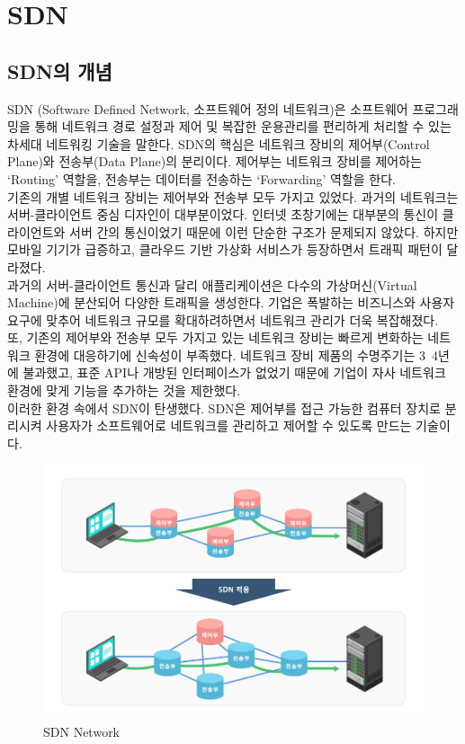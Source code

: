 \section{SDN}
\subsection{SDN의 개념}
    SDN (Software Defined Network, 소프트웨어 정의 네트워크)은 소프트웨어 프로그래밍을 통해 네트워크 경로 설정과 제어 및 복잡한 운용관리를 편리하게 처리할 수 있는 차세대 네트워킹 기술을 말한다. SDN의 핵심은 네트워크 장비의 제어부(Control Plane)와 전송부(Data Plane)의 분리이다. 제어부는 네트워크 장비를 제어하는 ‘Routing’ 역할을, 전송부는 데이터를 전송하는 ‘Forwarding’ 역할을 한다. \\
    기존의 개별 네트워크 장비는 제어부와 전송부 모두 가지고 있었다. 과거의 네트워크는 서버-클라이언트 중심 디자인이 대부분이었다. 인터넷 초창기에는 대부분의 통신이 클라이언트와 서버 간의 통신이었기 때문에 이런 단순한 구조가 문제되지 않았다. 하지만 모바일 기기가 급증하고, 클라우드 기반 가상화 서비스가 등장하면서 트래픽 패턴이 달라졌다. \\
    과거의 서버-클라이언트 통신과 달리 애플리케이션은 다수의 가상머신(Virtual Machine)에 분산되어 다양한 트래픽을 생성한다. 기업은 폭발하는 비즈니스와 사용자 요구에 맞추어 네트워크 규모를 확대하려하면서 네트워크 관리가 더욱 복잡해졌다. \\
    또, 기존의 제어부와 전송부 모두 가지고 있는 네트워크 장비는 빠르게 변화하는 네트워크 환경에 대응하기에 신속성이 부족했다. 네트워크 장비 제품의 수명주기는 3~4년에 불과했고, 표준 API나 개방된 인터페이스가 없었기 때문에 기업이 자사 네트워크 환경에 맞게 기능을 추가하는 것을 제한했다. \\
    이러한 환경 속에서 SDN이 탄생했다. SDN은 제어부를 접근 가능한 컴퓨터 장치로 분리시켜 사용자가 소프트웨어로 네트워크를 관리하고 제어할 수 있도록 만드는 기술이다. \\
    \vspace{-4mm}
    \begin{figure}[!h]\centering
		\includegraphics[width=.65\textwidth]{image/week05/1-1.png}
		\caption{\small SDN Network}
		\vspace{-10pt}
    \end{figure}
    
